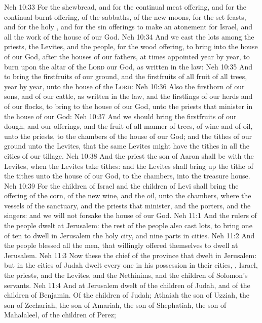 \vs Neh 10:33 For the shewbread, and for the continual meat offering, and for the continual burnt offering, of the sabbaths, of the new moons, for the set feasts, and for the holy , and for the sin offerings to make an atonement for Israel, and  all the work of the house of our God.
\vs Neh 10:34 And we cast the lots among the priests, the Levites, and the people, for the wood offering, to bring  into the house of our God, after the houses of our fathers, at times appointed year by year, to burn upon the altar of the \textsc{Lord} our God, as  written in the law:
\vs Neh 10:35 And to bring the firstfruits of our ground, and the firstfruits of all fruit of all trees, year by year, unto the house of the \textsc{Lord}:
\vs Neh 10:36 Also the firstborn of our sons, and of our cattle, as  written in the law, and the firstlings of our herds and of our flocks, to bring to the house of our God, unto the priests that minister in the house of our God:
\vs Neh 10:37 And  we should bring the firstfruits of our dough, and our offerings, and the fruit of all manner of trees, of wine and of oil, unto the priests, to the chambers of the house of our God; and the tithes of our ground unto the Levites, that the same Levites might have the tithes in all the cities of our tillage.
\vs Neh 10:38 And the priest the son of Aaron shall be with the Levites, when the Levites take tithes: and the Levites shall bring up the tithe of the tithes unto the house of our God, to the chambers, into the treasure house.
\vs Neh 10:39 For the children of Israel and the children of Levi shall bring the offering of the corn, of the new wine, and the oil, unto the chambers, where  the vessels of the sanctuary, and the priests that minister, and the porters, and the singers: and we will not forsake the house of our God.
\vs Neh 11:1 And the rulers of the people dwelt at Jerusalem: the rest of the people also cast lots, to bring one of ten to dwell in Jerusalem the holy city, and nine parts  in  cities.
\vs Neh 11:2 And the people blessed all the men, that willingly offered themselves to dwell at Jerusalem.
\vs Neh 11:3 Now these  the chief of the province that dwelt in Jerusalem: but in the cities of Judah dwelt every one in his possession in their cities, , Israel, the priests, and the Levites, and the Nethinims, and the children of Solomon's servants.
\vs Neh 11:4 And at Jerusalem dwelt  of the children of Judah, and of the children of Benjamin. Of the children of Judah; Athaiah the son of Uzziah, the son of Zechariah, the son of Amariah, the son of Shephatiah, the son of Mahalaleel, of the children of Perez;
